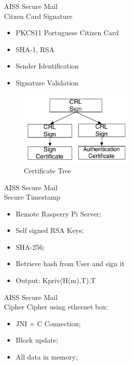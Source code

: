 \begin{frame}{AISS Secure Mail \\ \small Citzen Card Signature}
\begin{itemize}
\item PKCS11 Portuguese Citizen Card
\item SHA-1, RSA
\item Sender Identification
\item Signature Validation
\end{itemize}
\begin{figure}
	\centering
	\includegraphics[width=0.5\textwidth]{./images/certificate.pdf}	
 	\caption{Certificate Tree}
	\label{fig:}
\end{figure}
\end{frame}


\begin{frame}{AISS Secure Mail \\ \small Secure Timestamp}
\begin{itemize}
\item Remote Rasperry Pi Server;
\item Self signed RSA Keys;
\item SHA-256;
\item Retrieve hash from User and sign it
\item Output: Kpriv(H(m),T),T
\end{itemize}		
\end{frame}


\begin{frame}{AISS Secure Mail \\ \small Cipher}
Cipher using ethernet box:
\begin{itemize}
\item JNI + C Connection;
\item Block update;
\item All data in memory;
\end{itemize}			
\end{frame}




